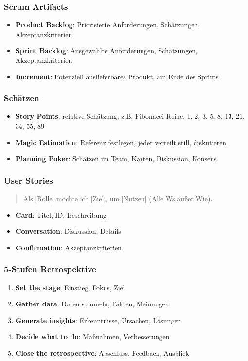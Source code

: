 \documentclass{article}
\begin{document}
\subsubsection{Scrum Artifacts}
\begin{itemize}
  \item \textbf{Product Backlog}: Priorisierte Anforderungen, Schätzungen, Akzeptanzkriterien
  \item \textbf{Sprint Backlog}: Ausgewählte Anforderungen, Schätzungen, Akzeptanzkriterien
  \item \textbf{Increment}: Potenziell auslieferbares Produkt, am Ende des Sprints
\end{itemize}

\subsubsection{Schätzen}
\begin{itemize}
  \item \textbf{Story Points}: relative Schätzung, z.B. Fibonacci-Reihe, 1, 2, 3, 5, 8, 13, 21, 34, 55, 89
  \item \textbf{Magic Estimation}: Referenz festlegen, jeder verteilt still, diskutieren
  \item \textbf{Planning Poker}: Schätzen im Team, Karten, Diskussion, Konsens
\end{itemize}

\subsubsection{User Stories}
\begin{quote}Als [Rolle] möchte ich [Ziel], um [Nutzen] (Alle Ws außer Wie).\end{quote}

\begin{itemize}
  \item \textbf{Card}: Titel, ID, Beschreibung
  \item \textbf{Conversation}: Diskussion, Details
  \item \textbf{Confirmation}: Akzeptanzkriterien
\end{itemize}

\subsubsection{5-Stufen Retrospektive}
\begin{enumerate}
  \item \textbf{Set the stage}: Einstieg, Fokus, Ziel
  \item \textbf{Gather data}: Daten sammeln, Fakten, Meinungen
  \item \textbf{Generate insights}: Erkenntnisse, Ursachen, Lösungen
  \item \textbf{Decide what to do}: Maßnahmen, Verbesserungen
  \item \textbf{Close the retrospective}: Abschluss, Feedback, Ausblick
\end{enumerate}
\end{document}
